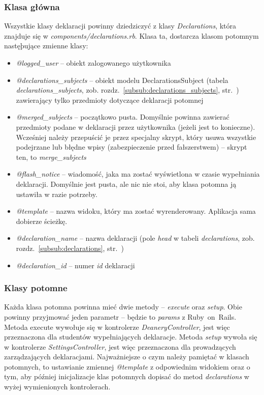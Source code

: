 \documentclass[a4paper,12pt,oneside]{report}
\begin{document}
\subsubsection{Klasa główna}
Wszystkie klasy deklaracji powinny dziedziczyć z klasy \emph{Declarations}, która znajduje się w \emph{components/declarations.rb}. Klasa ta, dostarcza klasom potomnym nastęþujące zmienne klasy:
\begin{itemize}
  \item \emph{@logged\_user} -- obiekt zalogowanego użytkownika
  \item \emph{@declarations\_subjects} -- obiekt modelu DeclarationsSubject (tabela \emph{declarations\_subjects}, zob. rozdz.~\ref{subsub:declarations_subjects}, str.~\pageref{subsub:declarations_subjects}) zawierający tylko przedmioty dotyczące deklaracji potomnej
  \item \emph{@merged\_subjects} -- początkowo pusta. Domyślnie powinna zawierać przedmioty podane w deklaracji przez użytkownika (jeżeli jest to konieczne). Wcześniej należy przepuścić je przez specjalny skrypt, który usuwa wszystkie podejrzane lub błędne wpisy (zabezpieczenie przed fałszerstwem) -- skrypt ten, to \emph{merge\_subjects}
  \item \emph{@flash\_notice} -- wiadomość, jaka ma zostać wyświetlona w czasie wypełniania deklaracji. Domyślnie jest pusta, ale nic nie stoi, aby klasa potomna ją ustawiła w razie potrzeby.
  \item \emph{@template} -- nazwa widoku, który ma zostać wyrenderowany. Aplikacja sama dobierze ścieżkę.
  \item \emph{@declaration\_name} -- nazwa deklaracji (pole \emph{head} w tabeli \emph{declarations}, zob. rozdz.~\ref{subsub:declarations}, str.~\pageref{subsub:declarations})
  \item \emph{@declaration\_id} -- numer \emph{id} deklaracji
\end{itemize}

\subsubsection{Klasy potomne}
Każda klasa potomna powinna mieć dwie metody -- \emph{execute} oraz \emph{setup}. Obie powinny przyjmować jeden parametr -- będzie to \emph{params} z Ruby~on~Rails. Metoda execute wywołuje się w kontrolerze \emph{DeaneryController}, jest więc przeznaczona dla studentów wypełniających deklaracje. Metoda \emph{setup} wywoła się w kontrolerze \emph{SettingsController}, jest więc przeznaczona dla prowadzących zarządzających deklaracjami. Najważniejsze o czym należy pamiętać w klasach potomnych, to ustawianie zmiennej \emph{@template} z odpowiednim widokiem oraz o tym, aby później inicjalizacje klas potomnych dopisać do metod \emph{declarations} w wyżej wymienionych kontrolerach.
\end{document}
